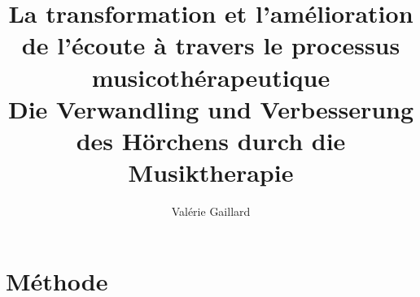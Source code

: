 \documentclass[12pt,pagesize, DIV=14, oneside, headsepline,
titlepage,parskip, headings=small, listof=totoc, 
bibliography=totoc,index=totoc, captions=tableheading, final]{scrreprt}
\title{La transformation et l'amélioration de l'écoute à travers le
  processus musicothérapeutique\\
Die Verwandling und Verbesserung des Hörchens durch die Musiktherapie}
\author{Valérie Gaillard}
\begin{document}
\maketitle
\part{Méthode}

\tableofcontents


 






\appendix

\nocite{*} %
\label{bibliographie}
\printbibliography
\end{document}
